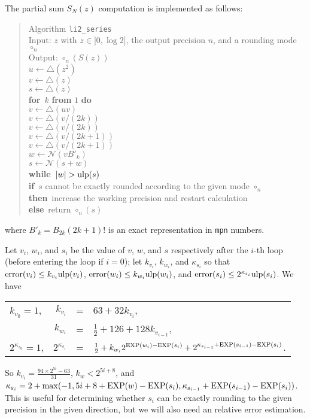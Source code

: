 \documentclass[12pt]{amsart}
\def\n{\textnormal}
\def\pinf{\bigtriangleup}
\def\q{\hspace*{5mm}}
\def\ulp{{\rm ulp}}
\def\Exp{{\rm EXP}}
\def\N{{\mathcal N}}
\def\If{{\bf if}}
\def\then{{\bf then}}
\def\Else{{\bf else}}
\def\for{{\bf for}}
\def\while{{\bf while}}
\begin{document}
The partial sum $S_N(z)$ computation is implemented as follows: 
\begin{quote}
Algorithm {\tt li2\_series}\\
Input: $z$ with $z \in ]0, \log2]$, the output precision $n$, and a rounding
  mode $\circ_n$ \\
Output: $\circ_n(S(z))$ \\
$u \leftarrow \pinf(z^2)$ \\
$v \leftarrow \pinf(z)$ \\
$s \leftarrow \pinf(z)$ \\
\for\ $k$ {\bf from} $1$ {\bf do}\\
\q $v \leftarrow \pinf(u v)$ \\
\q $v \leftarrow \pinf(v / (2k))$\\
\q $v \leftarrow \pinf(v / (2k))$\\
\q $v \leftarrow \pinf(v / (2k+1))$\\
\q $v \leftarrow \pinf(v / (2k+1))$\\
\q $w \leftarrow \N(v B'_k)$\\
\q $s \leftarrow \N(s + w)$\\
\while\ $|w| > \ulp(s)$\\
\If\ $s$ cannot be exactly rounded according to the given mode $\circ_n$\\
\then\ increase the working precision and restart calculation\\
\Else\ return $\circ_n(s)$
\end{quote}
where $B'_k = B_{2k} (2k+1)!$ is an exact representation in \texttt{mpn}
numbers.


Let $v_i$, $w_i$, and $s_i$ be the value of $v$, $w$, and $s$ respectively
after the $i$-th loop (before entering the loop if $i=0$); let $k_{v_i}$,
$k_{w_i}$, and $\kappa_{s_i}$ so that $\n{error}(v_i) \leq k_{v_i} \ulp(v_i)$,
$\n{error}(w_i) \leq k_{w_i} \ulp(w_i)$, and $\n{error}(s_i) \leq
2^{\kappa_{s_i}} \ulp(s_i)$. We have 

\begin{tabular}{l r c l}
$k_{v_0} = 1$, & $k_{v_i}$ & = & $63 + 32 k_{v_i}$,\\
& $k_{w_i}$ & = & $\frac{1}{2} + 126 + 128 k_{v_{i-1}}$,\\
$2^{\kappa_{s_0}} = 1$, & $2^{\kappa_{s_i}}$ & = & $\frac{1}{2}
+ k_{w_i} 2^{\Exp(w_i) - \Exp(s_i)} + 2^{\kappa_{s_{i-1}}+\Exp(s_{i-1})-\Exp(s_i)}$.
\end{tabular}

So $k_{v_i} = \frac{94 \times 2^{5i}-63}{31}$, $k_w < 2^{5i+8}$, and 
$\kappa_{s_i} = 2 + {\rm max}(-1, 5i + 8 + \Exp(w) - \Exp(s_i),
\kappa_{s_{i-1}} + \Exp(s_{i-1}) - \Exp(s_i))$.
This is useful for determining whether $s_i$ can be exactly rounding to the
given precision in the given direction, but we will also need an relative
error estimation.
\end{document}
